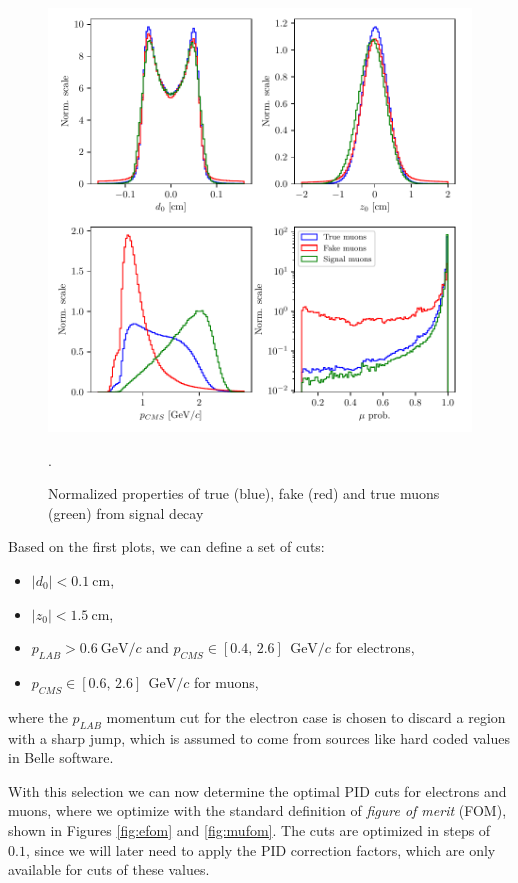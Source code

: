 \documentclass[oneside,a4paper,openany,12pt]{scrbook}
\newcommand {\e}[1]{\mathrm{~#1}}
\begin{document}
\begin{figure}[H]
\centering
\includegraphics[scale=0.8]{fig/FSP_mu_vars}
\captionsetup{width=.7\linewidth}
\caption{Normalized properties of true (blue), fake (red) and true muons (green) from signal decay}.
\label{fig:muvars}
\end{figure}

Based on the first plots, we can define a set of cuts:
\begin{itemize}
\item $\vert d_0 \vert < 0.1\e{cm}$,
\item $\vert z_0 \vert < 1.5\e{cm}$,
\item $p_{LAB} > 0.6\e{GeV}/c$ and $p_{CMS} \in [0.4,\,2.6]~\e{GeV}/c$ for electrons,
\item $p_{CMS} \in [0.6,\,2.6]~\e{GeV}/c$ for muons,
\end{itemize}

where the $p_{LAB}$ momentum cut for the electron case is chosen to discard a region with a sharp jump, which is assumed to come from sources like hard coded values in Belle software.

With this selection we can now determine the optimal PID cuts for electrons and muons, where we optimize with the standard definition of \textit{figure of merit} (FOM), shown in Figures \ref{fig:efom} and \ref{fig:mufom}. The cuts are optimized in steps of $0.1$, since we will later need to apply the PID correction factors, which are only available for cuts of these values.
\end{document}
